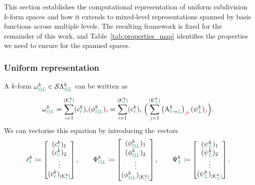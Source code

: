 \documentclass[a4paper, 12pt]{article}
\newcommand{\green}{\color{ForestGreen}}
\newcommand{\brickred}{\color{BrickRed}}
\newcommand{\K}{\mathcal{K}}
\newcommand{\coarseIdxone}{{\brickred i}}
\newcommand{\fineIdxone}{{\brickred j}}
\renewcommand{\l}{{\green\ell}}
\renewcommand{\L}{{\green L}}
\newcommand{\constrQ}[5]{ ( {#1}^{#2}_{#3 \vert #4} )_{#5}} %
\newcommand{\constrVec}[4]{ {#1}^{#2}_{#3 \vert #4} }
\newcommand{\freeQ}[4]{ ( {#1}^{#2}_{#3} )_{#4}}
\newcommand{\freeVec}[3]{ {#1}^{#2}_{#3}}
\newcommand{\Amatij}[5]{\left(\mathbf{\mathrm{A}}^{#1}_{#2 \to #3}\right)_{#4 #5}}
\newcommand{\FEECbasis}{\psi}
\newcommand{\FEECbases}{\Psi}
\newcommand{\SDFspace}[3]{\mathcal{S}\Lambda^{#1}_{#2 \vert #3}}
\newcommand{\SDFbasis}{\phi}
\newcommand{\SDFbases}{\Phi}
\newcommand{\sumdimlk}[2]{\vert \K^{#2}_{#1} \vert}
\theoremstyle{definition}
\theoremstyle{plain}
\numberwithin{equation}{section}
\begin{document}
This section establishes the computational representation of uniform subdivision $k$-form spaces and how it extends to mixed-level representations spanned by basis functions across multiple levels. The resulting framework is fixed for the remainder of this work, and Table~\ref{tab:properties_map} identifies the properties we need to ensure for the spanned spaces.

\subsubsection{Uniform representation}
\label{subsubsec:uniform_representation}

A $k$-form $\constrVec{\omega}{k}{\l}{\L} \in \SDFspace{k}{\l}{\L}$ can be written as
\begin{equation}
    \constrVec{\omega}{k}{\l}{\L} = \sum\limits_{\coarseIdxone = 1}^{\sumdimlk{\l}{k}} \freeQ{c}{k}{\l}{\coarseIdxone} \constrQ{\SDFbasis}{k}{\l}{\L}{\coarseIdxone} = \sum\limits_{i = 1}^{\sumdimlk{\l}{k}} \freeQ{c}{k}{\l}{\coarseIdxone} \; \Big( \sum\limits_{\fineIdxone = 1}^{\sumdimlk{\L}{k}} \Amatij{k}{\l}{\L}{\fineIdxone}{\coarseIdxone} \freeQ{\FEECbasis}{k}{\L}{\fineIdxone} \Big).
\end{equation}
We can vectorise this equation by introducing the vectors
\begin{equation}
    \freeVec{\bar{c}}{k}{\l} \coloneqq \begin{bmatrix}
        \freeQ{c}{k}{\l}{1} \\
        \freeQ{c}{k}{\l}{2} \\
        \vdots \\
        \freeQ{c}{k}{\l}{\sumdimlk{\l}{k}}
    \end{bmatrix}, \qquad 
    \constrVec{\SDFbases}{k}{\l}{\L} \coloneqq \begin{bmatrix}
        \constrQ{\SDFbasis}{k}{\l}{\L}{1} \\
        \constrQ{\SDFbasis}{k}{\l}{\L}{2} \\
        \vdots \\
        \constrQ{\SDFbasis}{k}{\l}{\L}{\sumdimlk{\l}{k}}
    \end{bmatrix}, \qquad 
    \freeVec{\FEECbases}{k}{\L} \coloneqq \begin{bmatrix}
        \freeQ{\FEECbasis}{k}{\L}{1} \\
        \freeQ{\FEECbasis}{k}{\L}{2} \\
        \vdots \\
        \freeQ{\FEECbasis}{k}{\L}{\sumdimlk{\L}{k}}
    \end{bmatrix}.
\end{equation}
\end{document}
